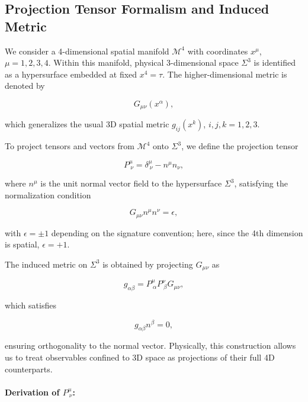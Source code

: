 \documentclass[12pt,a4paper]{article}
\numberwithin{equation}{section}
\begin{document}
\subsection{Projection Tensor Formalism and Induced Metric}

We consider a 4-dimensional spatial manifold \(\mathcal{M}^4\) with coordinates \(x^\mu\), \(\mu = 1, 2, 3, 4\). Within this manifold, physical 3-dimensional space \(\Sigma^3\) is identified as a hypersurface embedded at fixed \(x^4 = \tau\). The higher-dimensional metric is denoted by

\begin{equation}
    G_{\mu\nu}(x^\alpha),
\end{equation}

which generalizes the usual 3D spatial metric \(g_{ij}(x^k)\), \(i,j,k=1,2,3\).

To project tensors and vectors from \(\mathcal{M}^4\) onto \(\Sigma^3\), we define the projection tensor

\begin{equation}
    P^\mu_{\ \nu} = \delta^\mu_{\ \nu} - n^\mu n_\nu,
    \label{eq:projection_tensor}
\end{equation}

where \(n^\mu\) is the unit normal vector field to the hypersurface \(\Sigma^3\), satisfying the normalization condition

\begin{equation}
    G_{\mu\nu} n^\mu n^\nu = \epsilon,
    \label{eq:normalization_condition}
\end{equation}

with \(\epsilon = \pm 1\) depending on the signature convention; here, since the 4th dimension is spatial, \(\epsilon = +1\).

The induced metric on \(\Sigma^3\) is obtained by projecting \(G_{\mu\nu}\) as

\begin{equation}
    g_{\alpha \beta} = P^\mu_{\ \alpha} P^\nu_{\ \beta} G_{\mu \nu},
    \label{eq:induced_metric}
\end{equation}

which satisfies

\[
g_{\alpha\beta} n^\beta = 0,
\]

ensuring orthogonality to the normal vector. Physically, this construction allows us to treat observables confined to 3D space as projections of their full 4D counterparts.

\paragraph{Derivation of \(P^\mu_{\ \nu}\):}
\end{document}
